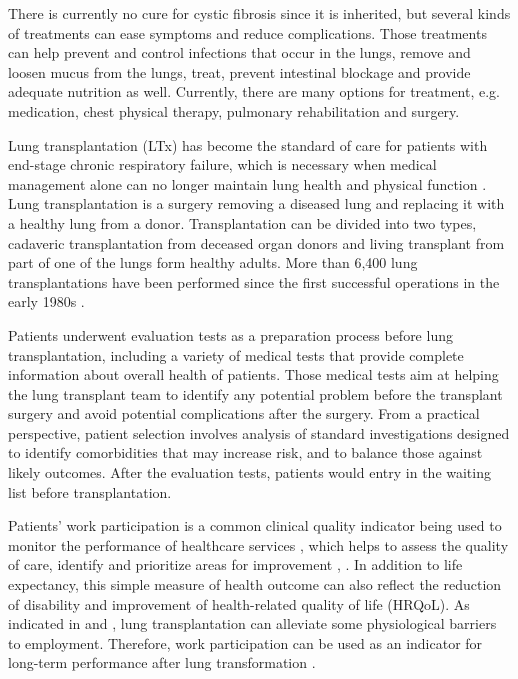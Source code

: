 \documentclass[11pt, a4paper]{article}\usepackage[]{graphicx}\usepackage[]{color}
\begin{document}
There is currently no cure for cystic fibrosis since it is inherited, but several kinds of treatments can ease symptoms and reduce complications. Those treatments can help prevent and control infections that occur in the lungs, remove and loosen mucus from the lungs, treat, prevent intestinal blockage and provide adequate nutrition as well. Currently, there are many options for treatment, e.g. medication, chest physical therapy, pulmonary rehabilitation and surgery. 

Lung transplantation (LTx) has become the standard of care for patients with end-stage chronic respiratory failure, which is necessary when medical management alone can no longer maintain lung health and physical function \citep{derhovanessian2018chronic}. Lung transplantation is a surgery removing a diseased lung and replacing it with a healthy lung from a donor. Transplantation can be divided into two types, cadaveric transplantation from deceased organ donors and living transplant from part of one of the lungs form healthy adults. More than 6,400 lung transplantations have been performed since the first successful operations in the early 1980s \citep{hosenpud1997registry}. 

Patients underwent evaluation tests as a preparation process before lung transplantation, including a variety of medical tests that provide complete information about overall health of patients. Those medical tests aim at helping the lung transplant team to identify any potential problem before the transplant surgery and avoid potential complications after the surgery. From a practical perspective, patient selection involves analysis of standard investigations designed to identify comorbidities that may increase risk, and to balance those against likely outcomes. After the evaluation tests, patients would entry in the waiting list before transplantation.

Patients' work participation is a common clinical quality indicator being used to monitor the performance of healthcare services \citep{choong2017linking}, which helps to assess the quality of care, identify and prioritize areas for improvement \citep{crampton2004makes}, \citep{mainz2003defining}. In addition to life expectancy, this simple measure of health outcome can also reflect the reduction of disability and improvement of health-related quality of life (HRQoL). As indicated in \cite{tumin2016attained} and \cite{suhling2015employment}, lung transplantation can alleviate some physiological barriers to employment. Therefore, work participation can be used as an indicator for long-term performance after lung transformation \citep{krivchenia2016long}. 
\end{document}
